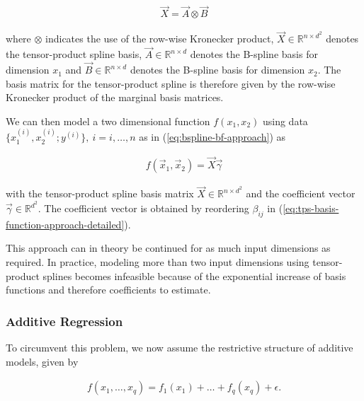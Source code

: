\documentclass[10pt,a4paper]{report}
\begin{document}
\begin{align}
	\vec{X} = \vec{A} \otimes \vec{B}
\end{align}

where $\otimes$ indicates the use of the row-wise Kronecker product, $\vec{X} \in \mathbb{R}^{n \times d^2}$ denotes the tensor-product spline basis, $\vec{A} \in \mathbb{R}^{n \times d}$ denotes the B-spline basis for dimension $x_1$ and $\vec{B} \in \mathbb{R}^{n \times d}$ denotes the B-spline basis for dimension $x_2$. The basis matrix for the tensor-product spline is therefore given by the row-wise Kronecker product of the marginal basis matrices. \cite{wood2017generalized}  

We can then model a two dimensional function $f(x_1, x_2)$ using data $\{x_1^{(i)}, x_2^{(i)}; y^{(i)} \}, \ i=i, \dots, n$ as in (\ref{eq:bspline-bf-approach}) as

\begin{align} \label{eq:tpspline-bf-approach}
	f(\vec{x}_1, \vec{x}_2) = \vec{X} \vec{\gamma}
\end{align}

with the tensor-product spline basis matrix $\vec{X} \in \mathbb{R}^{n \times d^2}$ and the coefficient vector $\vec{\gamma} \in \mathbb{R}^{d^2}$. The coefficient vector is obtained by reordering $\beta_{ij}$ in (\ref{eq:tps-basis-function-approach-detailed}).

This approach can in theory be continued for as much input dimensions as required. In practice, modeling more than two input dimensions using tensor-product splines becomes infeasible because of the exponential increase of basis functions and therefore coefficients to estimate. 


\subsubsection{Additive Regression} \label{subsubsec:STAR}
%

To circumvent this problem, we now assume the restrictive structure of additive models, given by

\begin{align} \label{eq:addRegBaseEquation}
	f(x_1, \dots, x_q) = f_1(x_1) + \dots + f_q(x_q) + \epsilon.
\end{align}
\end{document}

